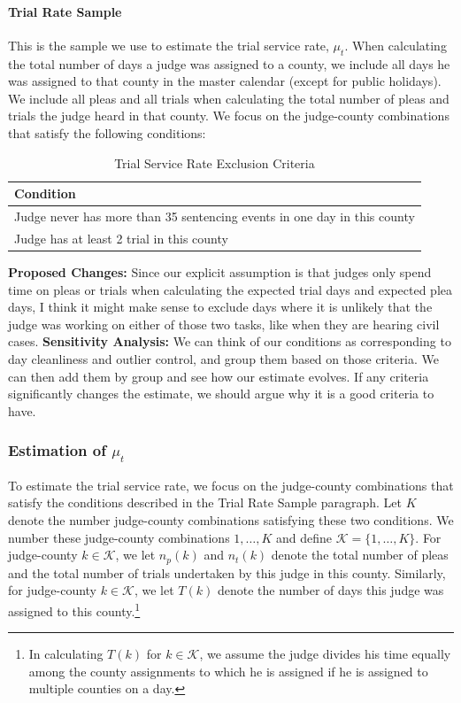 \documentclass[11pt]{article}
\theoremstyle{ModifiedStyle}
\theoremstyle{ModifiedStyle}
\begin{document}
      \paragraph{Trial Rate Sample} This is the sample we use to estimate the trial service rate, $\mu_t$. When calculating the total number of days a judge was assigned to a county, we include all days he was assigned to that county in the master calendar (except for public holidays). We include all pleas and all trials when calculating the total number of pleas and trials the judge heard in that county. We focus on the judge-county combinations that satisfy the following conditions:

        \begin{table}[H]
        \centering
        \caption{Trial Service Rate Exclusion Criteria}
        \begin{tabular}{|l|}
        \hline
        \textbf{Condition}                                                       \\ \hline
        Judge never has more than 35 sentencing events in one day in this county \\
        Judge has at least 2 trial in this county                                \\ \hline
        \end{tabular}
        \end{table}

        \textbf{Proposed Changes:} Since our explicit assumption is that judges only spend time on pleas or trials when calculating the expected trial days and expected plea days, I think it might make sense to exclude days where it is unlikely that the judge was working on either of those two tasks, like when they are hearing civil cases. \textbf{Sensitivity Analysis:} We can think of our conditions as corresponding to day cleanliness and outlier control, and group them based on those criteria. We can then add them by group and see how our estimate evolves. If any criteria significantly changes the estimate, we should argue why it is a good criteria to have.

    \subsubsection{Estimation of $\mu_t$}
      \label{mu_t-estimation}
      To estimate the trial service rate, we focus on the judge-county combinations that satisfy the conditions described in the Trial Rate Sample paragraph. Let $K$ denote the number judge-county combinations satisfying these two conditions. We number these judge-county combinations $1,\ldots,K$ and define $\mathcal{K} = \{1,\ldots,K\}$. For judge-county $k \in \mathcal{K}$, we let $n_p(k)$ and $n_t(k)$ denote the total number of pleas and the total number of trials undertaken by this judge in this county. Similarly, for judge-county $k \in \mathcal{K}$, we let $T(k)$ denote the number of days this judge was assigned to this county.\footnote{In calculating $T(k)$ for $k\in\mathcal{K}$, we assume the judge divides his time equally among the county assignments to which he is assigned if he is assigned to multiple counties on a day.}
\end{document}
